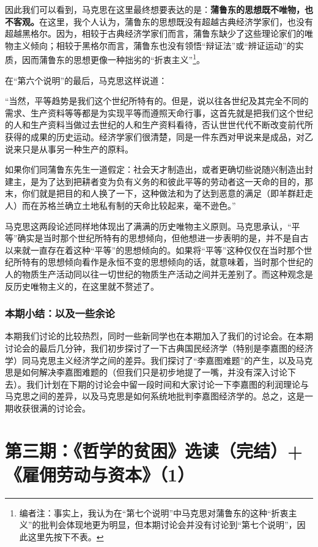 \documentclass[a4paper,twoside,12pt,AutoFakeBold]{ctexart}
\begin{document}
因此我们可以看到，马克思在这里最终想要表达的是：\textbf{蒲鲁东的思想既不唯物，也不客观。}在这里，我个人认为，蒲鲁东的思想既没有超越古典经济学家们，也没有超越黑格尔。因为，相较于古典经济学家们而言，蒲鲁东缺少了这些理论家们的唯物主义倾向；相较于黑格尔而言，蒲鲁东也没有领悟“辩证法”或“辨证运动”的实质，因而蒲鲁东的思想更像一种拙劣的“折衷主义”\footnote{编者注：事实上，我认为在“第七个说明”中马克思对蒲鲁东的这种“折衷主义”的批判会体现地更为明显，但本期讨论会并没有讨论到“第七个说明”，因此这里先按下不表。}。

在“第六个说明”的最后，马克思这样说道：
\begin{adjustwidth}{2em}{2em}
    \qquad\fangsong
    “当然，平等趋势是我们这个世纪所特有的。但是，说以往各世纪及其完全不同的需求、生产资料等等都是为实现平等而遵照天命行事，这首先就是把我们这个世纪的人和生产资料当做过去世纪的人和生产资料看待，否认世世代代不断改变前代所获得的成果的历史运动。经济学家们很清楚，同是一件东西对甲说来是成品，对乙说来只是从事另一种生产的原料。
    
    如果你们同蒲鲁东先生一道假定：社会天才制造出，或者更确切些说随兴制造出封建主，是为了达到把耕者变为负有义务的和彼此平等的劳动者这一天命的目的，那末，你们就是把目的和人换了一下，这种做法和为了达到恶意的满足（即羊群赶走人）而在苏格兰确立土地私有制的天命比较起来，毫不逊色。”
\end{adjustwidth}

马克思这两段论述同样地体现出了满满的历史唯物主义原则。马克思承认，“平等”确实是当时那个世纪所特有的思想倾向，但他想进一步表明的是，并不是自古以来就一直存在着这种“平等”的思想倾向的。如果将“平等”这种仅仅在当时那个世纪所特有的思想倾向看作是永恒不变的思想倾向的话，就意味着，当时那个世纪的人的物质生产活动同以往一切世纪的物质生产活动之间并无差别了。而这种观念是反历史唯物主义的，在这里就不赘述了。

\subsubsection{本期小结：以及一些余论}
本期我们讨论的比较热烈，同时一些新同学也在本期加入了我们的讨论会。在本期讨论会的最后几分钟，我们初步探讨了一下古典国民经济学（特别是李嘉图的经济学）同马克思主义经济学之间的差异。我们探讨了“李嘉图难题”的产生，以及马克思是如何解决李嘉图难题的（但我们只是初步地提了一嘴，并没有深入讨论下去）。我们计划在下期的讨论会中留一段时间和大家讨论一下李嘉图的利润理论与马克思之间的差异，以及马克思是如何系统地批判李嘉图经济学的。总之，这是一期收获很满的讨论会。
\newpage
\section{第三期：《哲学的贫困》选读（完结）+《雇佣劳动与资本》（1）}
\end{document}
